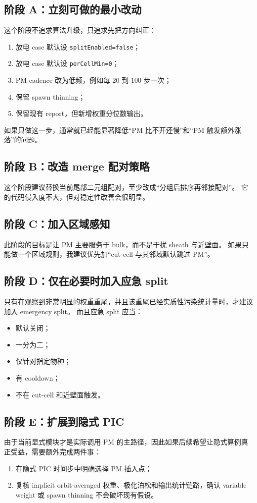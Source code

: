 \documentclass[UTF8,11pt,a4paper]{ctexart}
\begin{document}
\subsection{阶段 A：立刻可做的最小改动}
这个阶段不追求算法升级，只追求先把方向纠正：
\begin{enumerate}[itemsep=3pt]
  \item 放电 case 默认设 \texttt{splitEnabled=false}；
  \item 放电 case 默认设 \texttt{perCellMin=0}；
  \item PM cadence 改为低频，例如每 20 到 100 步一次；
  \item 保留 spawn thinning；
  \item 保留现有 report，但新增权重分位数输出。
\end{enumerate}

如果只做这一步，通常就已经能显著降低“PM 比不开还慢”和“PM 触发额外涨落”的问题。

\subsection{阶段 B：改造 merge 配对策略}
这个阶段建议替换当前尾部二元组配对，至少改成“分组后排序再邻接配对”。
它的代码侵入度不大，但对稳定性改善会很明显。

\subsection{阶段 C：加入区域感知}
此阶段的目标是让 PM 主要服务于 bulk，而不是干扰 sheath 与近壁面。
如果只能做一个区域规则，我建议优先加“cut-cell 与其邻域默认跳过 PM”。

\subsection{阶段 D：仅在必要时加入应急 split}
只有在观察到非常明显的权重重尾，并且该重尾已经实质性污染统计量时，才建议加入 emergency split。
而且应急 split 应当：
\begin{itemize}[itemsep=2pt]
  \item 默认关闭；
  \item 一分为二；
  \item 仅针对指定物种；
  \item 有 cooldown；
  \item 不在 cut-cell 和近壁面触发。
\end{itemize}

\subsection{阶段 E：扩展到隐式 PIC}
由于当前显式模块才是实际调用 PM 的主路径，因此如果后续希望让隐式算例真正受益，需要额外完成两件事：
\begin{enumerate}[itemsep=3pt]
  \item 在隐式 PIC 时间步中明确选择 PM 插入点；
  \item 复核 implicit orbit-averaged 权重、极化泊松和输出统计链路，确认 variable weight 或 spawn thinning 不会破坏现有假设。
\end{enumerate}
\end{document}
